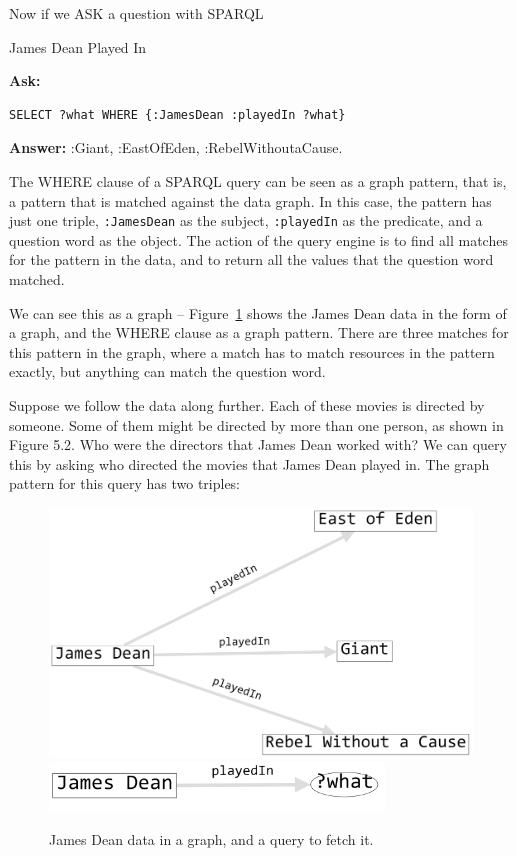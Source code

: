 Now if we ASK a question with SPARQL
\begin{query}James Dean Played In\end{query}

\textbf{\textbf{Ask:}} 
\begin{lstlisting}
SELECT ?what WHERE {:JamesDean :playedIn ?what}
\end{lstlisting}
\textbf{\textbf{Answer:}} :Giant, :EastOfEden, :RebelWithoutaCause.

The WHERE clause of a SPARQL query can be seen as a graph pattern, that
is, a pattern that is matched against the data graph. In this case, the
pattern has just one triple, \texttt{:JamesDean} as the subject, \texttt{:playedIn} as the
predicate, and a question word as the object. The action of the query
engine is to find all matches for the pattern in the data, and to return
all the values that the question word matched.

We can see this as a graph -- Figure~\ref{fig:ch06.1} shows the James Dean data in
the form of a graph, and the WHERE clause as a graph pattern. There are
three matches for this pattern in the graph, where a match has to match
resources in the pattern exactly, but anything can match the question
word.

Suppose we follow the data along further. Each of these movies is
directed by someone. Some of them might be directed by more than one
person, as shown in Figure 5.2. Who were the directors that
James Dean worked with? We can query this by asking who directed the
movies that James Dean played in. The graph pattern for this query has
two triples:

\begin{figure}
\centering
\includegraphics[width=5in]{SWWOv3/media/ch6/figure6-1a.png}
\includegraphics[width=3.5in]{SWWOv3/media/ch6/figure6-1b.png}
\caption{James Dean data in a graph, and a query to fetch it.}
\label{fig:ch06.1}
\end{figure}

